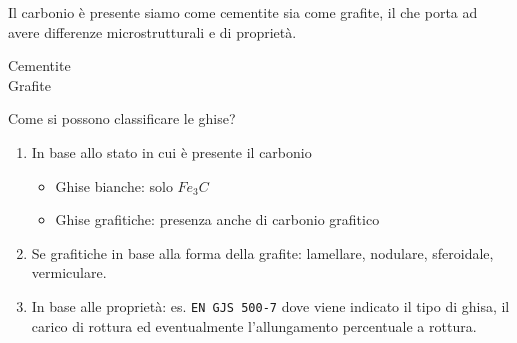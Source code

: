 Il carbonio è presente siamo come cementite sia come grafite, il che porta ad avere differenze microstrutturali e di proprietà.

\begin{description}
\item[Cementite]\todo{\\Aggiungere}
\item[Grafite]
\end{description}
Come si possono classificare le ghise?

\begin{enumerate}
\item In base allo stato in cui è presente il carbonio
	\begin{itemize}
	\item Ghise bianche: solo $Fe_3C$
	\item Ghise grafitiche: presenza anche di carbonio grafitico 
	\end{itemize}
\item Se grafitiche in base alla forma della grafite: lamellare, nodulare, sferoidale, vermiculare.
\item In base alle proprietà: es. \texttt{EN GJS 500-7} dove viene indicato il tipo di ghisa, il carico di rottura ed eventualmente l'allungamento percentuale a rottura.
\end{enumerate}

